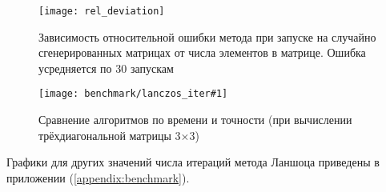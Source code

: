 \begin{figure}[h]
    \centering\texttt{[image: rel\_deviation]}
    \caption{Зависимость относительной ошибки метода при запуске на случайно сгенерированных матрицах от числа элементов в матрице. Ошибка усредняется по 30 запускам}
    \label{fig:rel_deviation}
\end{figure}

\newcommand{\lanczosBenchmarkFig}[1]{
    \begin{figure}[H]
        \texttt{[image: benchmark/lanczos\_iter\#1]}
        \caption{ Сравнение алгоритмов по времени и точности (при вычислении трёхдиагональной матрицы #1$\times$#1) }
        \label{fig:lanczos_benchmark#1}
    \end{figure}
}

\lanczosBenchmarkFig{3}

Графики для других значений числа итераций метода Ланшоца приведены в приложении (\ref{appendix:benchmark}).
